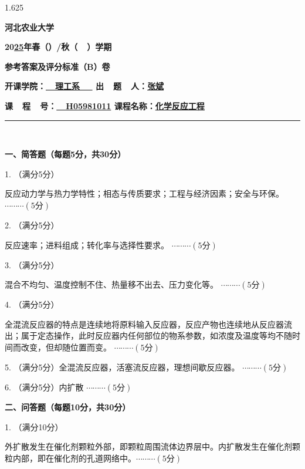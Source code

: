 \documentclass[12pt, a4paper]{article}
\begin{document}
\begin{spacing}{1.625}


\centerline{{\Large \bf{河北农业大学}}}

\centerline{\bf{\Large 20\underline{25}年春（\quad ）/秋（\ \surd \ ）学期}}

\centerline{\Large \bf 参考答案及评分标准（B）卷}

\centerline{\bf 开课学院：\underline{\ \ \quad 理工系 \quad \ \ } \quad 出\ \ 题\ \ 人：\underline{\quad \qquad \qquad 张斌\quad \qquad \qquad}}

\centerline{\bf 课\ \ 程\ \ 号：\underline{\ \ H05981011\quad} \quad 课程名称：\underline{\quad \qquad 化学反应工程 \qquad \quad }}

{{\noindent} \hspace{-2em} \rule[0pt]{16cm}{0.15em}}\\

\vspace{-2em}

{\bf 一、简答题（每题5分，共30分）}

1. （满分5分）

反应动力学与热力学特性；相态与传质要求；工程与经济因素；安全与环保。 \hfill $\cdots \cdots \cdots (5\text{分})$

2. （满分5分）

反应速率；进料组成；转化率与选择性要求。 \hfill $\cdots \cdots \cdots (5\text{分})$

3. （满分5分）

混合不均匀、温度控制不住、热量移不出去、压力变化等。 \hfill $\cdots \cdots \cdots (5\text{分})$

4. （满分5分）

全混流反应器的特点是连续地将原料输入反应器，反应产物也连续地从反应器流出；属于定态操作，此时反应器内任何部位的物系参数，如浓度及温度等均不随时间而改变，但却随位置而变。 \hfill $\cdots \cdots \cdots (5\text{分})$

5. （满分5分）全混流反应器，活塞流反应器，理想间歇反应器。 \hfill $\cdots \cdots \cdots (5\text{分})$

6. （满分5分）内扩散 \hfill $\cdots \cdots \cdots (5\text{分})$



{\bf 二、问答题（每题10分，共30分）}

1. （满分10分）

外扩散发生在催化剂颗粒外部，即颗粒周围流体边界层中。内扩散发生在催化剂颗粒内部，即在催化剂的孔道网络中。\hfill $\cdots \cdots \cdots (5\text{分})$


\end{spacing}
\end{document}
